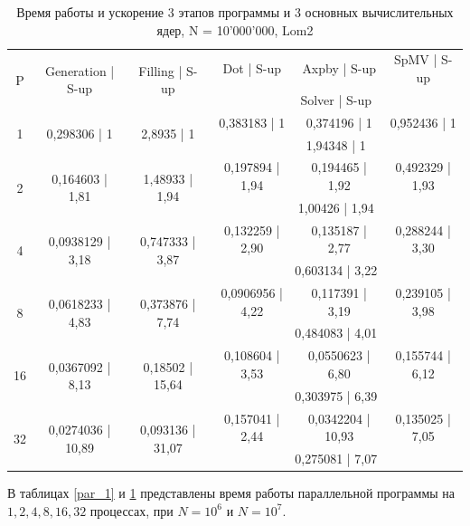 		\begin{table}[H]
			\begin{tabular}{|c||c|c|c|c|c|}
				\hline
				\multirow{2}{*}{P} &  \multirow{2}{*}{Generation | S-up} & \multirow{2}{*}{Filling | S-up} & Dot | S-up & Axpby | S-up & SpMV | S-up \\ \cline{4-6}
				                   &                              &                         & \multicolumn{3}{c|}{Solver | S-up} \\ \hline
                \multirow{2}{*}{1} & \multirow{2}{*}{0,298306 | 1} & \multirow{2}{*}{2,8935 | 1} & 0,383183 | 1 & 0,374196 | 1 & 0,952436 | 1 \\ \cline{4-6}
                                   &                   &                   & \multicolumn{3}{c|}{1,94348 | 1}   \\ \hline
                \multirow{2}{*}{2} & \multirow{2}{*}{0,164603 | 1,81} & \multirow{2}{*}{1,48933 | 1,94} & 0,197894 | 1,94 & 0,194465 | 1,92& 0,492329 | 1,93 \\ \cline{4-6}
                                   &                   &                   & \multicolumn{3}{c|}{1,00426 | 1,94}   \\ \hline
                \multirow{2}{*}{4} & \multirow{2}{*}{0,0938129 | 3,18} & \multirow{2}{*}{0,747333 | 3,87} & 0,132259 | 2,90& 0,135187 | 2,77& 0,288244 | 3,30 \\ \cline{4-6}
                                   &                   &                   & \multicolumn{3}{c|}{0,603134 | 3,22}   \\ \hline
                \multirow{2}{*}{8} & \multirow{2}{*}{0,0618233 | 4,83} & \multirow{2}{*}{0,373876 | 7,74} & 0,0906956 | 4,22& 0,117391 | 3,19& 0,239105 | 3,98\\ \cline{4-6}
                                   &                   &                   & \multicolumn{3}{c|}{0,484083 | 4,01}   \\ \hline
                \multirow{2}{*}{16} & \multirow{2}{*}{0,0367092 | 8,13} & \multirow{2}{*}{0,18502 | 15,64} & 0,108604 | 3,53& 0,0550623 | 6,80& 0,155744 | 6,12\\ \cline{4-6}
                                   &                   &                   & \multicolumn{3}{c|}{0,303975 | 6,39}   \\ \hline
                \multirow{2}{*}{32} & \multirow{2}{*}{0,0274036 | 10,89} & \multirow{2}{*}{0,093136 | 31,07} & 0,157041 | 2,44& 0,0342204 | 10,93& 0,135025 | 7,05\\ \cline{4-6}
                                   &                   &                   & \multicolumn{3}{c|}{0,275081 | 7,07}   \\ \hline

			\end{tabular}
			\caption{Время работы и ускорение 3 этапов программы и 3 основных вычислительных ядер, N = 10'000'000, Lom2}
			\label{par_2}
		\end{table}
		В таблицах \ref{par_1} и \ref{par_2} представлены время работы параллельной программы на \(1, 2, 4, 8, 16, 32\) процессах, при \(N = 10^6\) и \(N = 10^7\).

